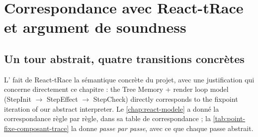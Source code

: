 \section{Correspondance avec React-tRace et argument de soundness}
\label{sec:point-fixe-composant-soundness}

\subsection{Un tour abstrait, quatre transitions concrètes}

L' fait de React-tRace la sémantique concrète du projet, avec une
justification qui concerne directement ce chapitre : \og the Tree Memory +
render loop model (StepInit $\to$ StepEffect $\to$ StepCheck) directly
corresponds to the fixpoint iteration of our abstract interpreter\fg. Le
\cref{chap:react-modele} a donné la correspondance règle par règle, dans
sa table de correspondance ; la
\cref{tab:point-fixe-composant-trace} la donne \emph{passe par passe}, avec
ce que chaque passe abstrait.

